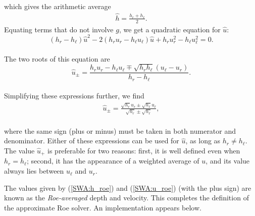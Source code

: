 \documentclass{SIAMbook2016}
\begin{document}
which gives the arithmetic average\\
\begin{align}  \label{SWA:h_roe}
\hat{h} = \frac{h_r + h_\ell}{2}.
\end{align} Equating terms that do not involve \(g\), we get a quadratic
equation for \(\hat{u}\):\\
\[(h_r-h_\ell)\hat{u}^2 - 2(h_r u_r - h_\ell u_\ell) \hat{u} + h_r u_r^2 - h_\ell u_\ell^2 = 0.\]\\
The two roots of this equation are\\
\[\hat{u}_\pm = \frac{h_r u_r - h_\ell u_\ell \mp \sqrt{h_r h_\ell} (u_\ell-u_r)}{h_r-h_\ell}.\]\\
Simplifying these expressions further, we find\\
\begin{align} \label{SWA:u_roe}
    \hat{u}_\pm = \frac{\sqrt{h_r}u_r \pm \sqrt{h_\ell}u_\ell}{\sqrt{h_r} \pm \sqrt{h_\ell}},
\end{align}\\
where the same sign (plus or minus) must be taken in both numerator and
denominator. Either of these expressions can be used for \(\hat{u}\), as
long as \(h_r \ne h_\ell\). The value \(\hat{u}_+\) is preferable for
two reasons: first, it is well defined even when \(h_r = h_\ell\);
second, it has the appearance of a weighted average of \(u\), and its
value always lies between \(u_\ell\) and \(u_r\).

The values given by (\ref{SWA:h_roe}) and (\ref{SWA:u_roe}) (with the
plus sign) are known as the \emph{Roe-averaged} depth and velocity. This
completes the definition of the approximate Roe solver. An
implementation appears below.
\end{document}

